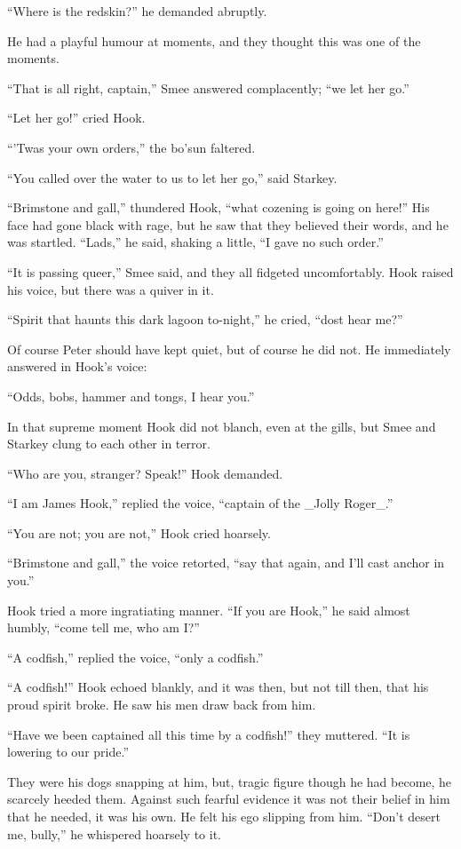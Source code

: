 ``Where is the redskin?'' he demanded abruptly.

He had a playful humour at moments, and they thought this was one of
the moments.

``That is all right, captain,'' Smee answered complacently; ``we let her
go.''

``Let her go!'' cried Hook.

``'Twas your own orders,'' the bo'sun faltered.

``You called over the water to us to let her go,'' said Starkey.

``Brimstone and gall,'' thundered Hook, ``what cozening is going on here!''
His face had gone black with rage, but he saw that they believed their
words, and he was startled. ``Lads,'' he said, shaking a little, ``I gave
no such order.''

``It is passing queer,'' Smee said, and they all fidgeted uncomfortably.
Hook raised his voice, but there was a quiver in it.

``Spirit that haunts this dark lagoon to-night,'' he cried, ``dost hear
me?''

Of course Peter should have kept quiet, but of course he did not. He
immediately answered in Hook's voice:

``Odds, bobs, hammer and tongs, I hear you.''

In that supreme moment Hook did not blanch, even at the gills, but Smee
and Starkey clung to each other in terror.

``Who are you, stranger? Speak!'' Hook demanded.

``I am James Hook,'' replied the voice, ``captain of the _Jolly Roger_.''

``You are not; you are not,'' Hook cried hoarsely.

``Brimstone and gall,'' the voice retorted, ``say that again, and I'll
cast anchor in you.''

Hook tried a more ingratiating manner. ``If you are Hook,'' he said
almost humbly, ``come tell me, who am I?''

``A codfish,'' replied the voice, ``only a codfish.''

``A codfish!'' Hook echoed blankly, and it was then, but not till then,
that his proud spirit broke. He saw his men draw back from him.

``Have we been captained all this time by a codfish!'' they muttered. ``It
is lowering to our pride.''

They were his dogs snapping at him, but, tragic figure though he had
become, he scarcely heeded them. Against such fearful evidence it was
not their belief in him that he needed, it was his own. He felt his ego
slipping from him. ``Don't desert me, bully,'' he whispered hoarsely to
it.

